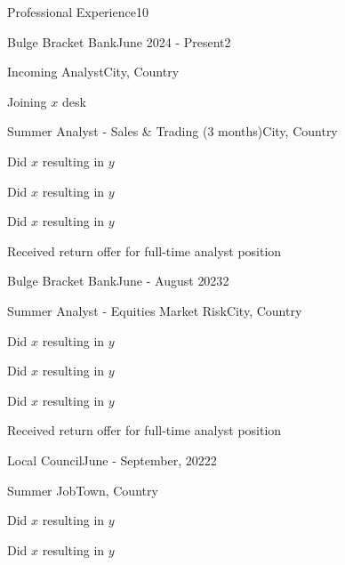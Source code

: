 \documentclass[10pt,a4paper]{CV}
\begin{document}
\begin{Section}{Professional Experience}{10}
    \begin{Institution}{Bulge Bracket Bank}{June 2024 - Present}{2}
        \begin{Position}{Incoming Analyst}{City, Country}
            \item Joining $x$ desk
            \vspace{-4pt}
        \end{Position}
        \begin{Position}{Summer Analyst - Sales \& Trading (3 months)}{City, Country}
            \item Did $x$ resulting in $y$
            \item Did $x$ resulting in $y$
            \item Did $x$ resulting in $y$
            \item Received return offer for full-time analyst position
        \end{Position}
    \end{Institution}
    
    \begin{Institution}{Bulge Bracket Bank}{June - August 2023}{2}
        \begin{Position}{Summer Analyst - Equities Market Risk}{City, Country}
            \item Did $x$ resulting in $y$
            \item Did $x$ resulting in $y$
            \item Did $x$ resulting in $y$
            \item Received return offer for full-time analyst position
        \end{Position}
    \end{Institution}
    
    \begin{Institution}{Local Council}{June - September, 2022}{2}
        \begin{Position}{Summer Job}{Town, Country}
            \item Did $x$ resulting in $y$
            \item Did $x$ resulting in $y$
        \end{Position}
    \end{Institution}
\end{Section}
\end{document}
